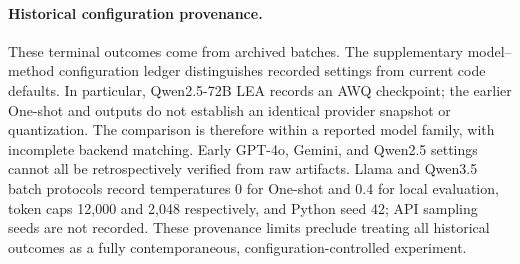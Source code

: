 \begin{revadded}
\paragraph{Historical configuration provenance.}
These terminal outcomes come from archived batches. The supplementary model--method configuration ledger distinguishes recorded settings from current code defaults. In particular, Qwen2.5-72B LEA records an AWQ checkpoint; the earlier One-shot and \samcgs{} outputs do not establish an identical provider snapshot or quantization. The comparison is therefore within a reported model family, with incomplete backend matching. Early GPT-4o, Gemini, and Qwen2.5 settings cannot all be retrospectively verified from raw artifacts. Llama and Qwen3.5 batch protocols record temperatures 0 for One-shot and 0.4 for local evaluation, token caps 12,000 and 2,048 respectively, and Python seed 42; API sampling seeds are not recorded. These provenance limits preclude treating all historical outcomes as a fully contemporaneous, configuration-controlled experiment.
\end{revadded}

